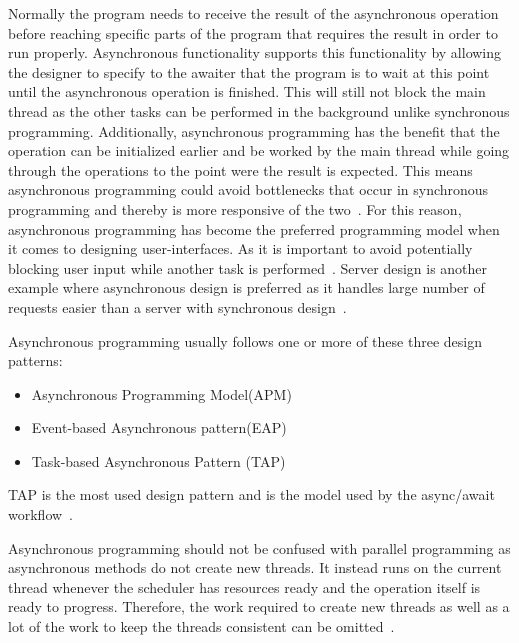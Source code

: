 Normally the program needs to receive the result of the asynchronous operation before reaching specific parts of the program that requires the result in order to run properly. Asynchronous functionality supports this functionality by allowing the designer to specify to the awaiter that the program is to wait at this point until the asynchronous operation is finished. This will still not block the main thread as the other tasks can be performed in the background unlike synchronous programming. Additionally, asynchronous programming has the benefit that the operation can be initialized earlier and be worked by the main thread while going through the operations to the point were the result is expected. This means asynchronous programming could avoid bottlenecks that occur in synchronous programming and thereby is more responsive of the two~\cite{DOC:TaskAsyncProgModel, WEB:AsyncAwaitTut}. 
For this reason, asynchronous programming has become the preferred programming model when it comes to designing user-interfaces. As it is important to avoid potentially blocking user input while another task is performed~\cites{VIDEO:AsyncConBack}[p.~214]{BOOK:DotnetMultithreadCookBook}. Server design is another example where asynchronous design is preferred as it handles large number of requests easier than a server with synchronous design~\cite{VIDEO:AsyncConBack, DOC:AsyncAwait}.

Asynchronous programming usually follows one or more of these three design patterns: 
\begin{itemize}
	\item{Asynchronous Programming Model(APM)}
	\item{Event-based Asynchronous pattern(EAP)}
	\item{Task-based Asynchronous Pattern (TAP)}
\end{itemize}
TAP is the most used design pattern and is the model used by the async/await workflow~\cite{DOC:AsyncAwait, WEB:AsyncAwaitTut}.

Asynchronous programming should not be confused with parallel programming as asynchronous methods do not create new threads. It instead runs on the current thread whenever the scheduler has resources ready and the operation itself is ready to progress. Therefore, the work required to create new threads as well as a lot of the work to keep the threads consistent can be omitted~\cite{DOC:TaskAsyncProgModel}. %

